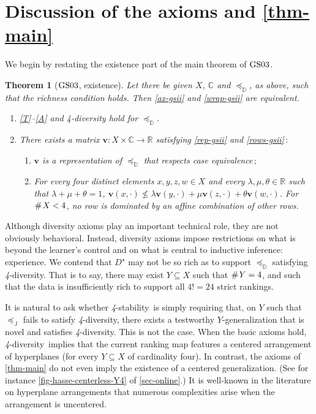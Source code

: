 \documentclass[ecta,nameyear,draft]{econsocart}
\newcommand{\countof}{\mathbin{\#}\hskip1pt}
\newcommand{\R}{\mathbb R}
\newcommand{\preceqb}{\mathbin{\preceq}}
\newcommand{\mbbd}{{\mathds D}}
\newcommand{\mbbc}{{\mathds C}}
\newcommand{\mbbj}{\mathds J}
\newcommand{\past}{{D^\star}}
\newcommand{\stability}{\textit{4}-\textup{{stability}}}
\newcommand{\fourdiv}{\textit{4}-\textup{diversity}}
\newcommand{\gsii}{$\textup{GS03}$}
\theoremstyle{plain}
\newtheorem*{theorem*}{Theorem}
\theoremstyle{remark}
\begin{document}
\section{Discussion of the axioms and \cref{thm-main}}\label{sec-discussion}
We begin by restating the existence part of the main theorem of \gsii.
\begin{theorem*}[\gsii, existence]\label{thm-gsii} Let there be given $X$,
  $\mbbc$ and $\preceqb_ \mbbd$, as above, such that the richness condition
  holds. Then \ref{ax-gsii} and \ref{wrap-gsii} are equivalent.
  \begin{enumerate}[label=\textup{(\roman*)}]
    \item\label{ax-gsii} \textup{\ref{T}--\ref{A}} and \textup{\fourdiv} hold
      for $\preceq_{\mbbd}$.
    \item\label{wrap-gsii} There exists a matrix $\mathbf{v} : X \times \mbbc
      \rightarrow \R$ satisfying \ref{rep-gsii} and \ref{rows-gsii}$\,:$
      \begin{enumerate}[label=\textup{(\alph*)}]
        \item\label{rep-gsii} $\mathbf{v}$ is a representation of
          $\preceq_{\mbbd}$ that respects case equivalence$\,;$
        \item\label{rows-gsii} For every four distinct elements $x,y,z,w \in X$
          and every $\lambda , \mu, \theta \in \R$ such that $\lambda +\mu +
          \theta = 1$, $\mathbf{v}(x,\cdot ) \not \leq \lambda
          \mathbf{v}(y,\cdot
          )+\mu
          \mathbf{v}(z,\cdot)+ \theta \mathbf{v}(w,\cdot)$.  For $\countof X <
          4$, no row is dominated by an affine combination of other rows.
      \end{enumerate} 
  \end{enumerate}
\end{theorem*}

Although diversity axioms play an important technical role, they are not
obviously behavioral. Instead, diversity axioms impose restrictions on what is
beyond the learner's control and on what is central to inductive inference:
experience. We contend that $\past$ may not be so rich as to support
$\preceqb_{\mbbd}$ satisfying \fourdiv. That is to say, there may exist $Y
\subseteq X$ such that $\countof Y = 4$, and such that the data is
insufficiently rich to support all $4 ! = 24$ strict rankings.

It is natural to ask whether \stability\ is simply requiring that, on $Y$ such
that $\preceq_{\mbbj}$ fails to satisfy \fourdiv, there exists a testworthy
$Y$-{generalization} that is novel and satisfies \fourdiv.  This is not the
case.  When the basic axioms hold, \fourdiv\ implies that the current ranking
map features a centered arrangement of hyperplanes (for every $Y\subseteq X$ of
cardinality four). In contrast, the axioms of \cref{thm-main} do not even imply
the existence of a centered generalization.  (See for instance
\cref{fig-hasse-centerless-Y4} of \cref{sec-online}.) It is well-known in the
literature on hyperplane arrangements that numerous complexities arise when the
arrangement is uncentered.
\end{document}
